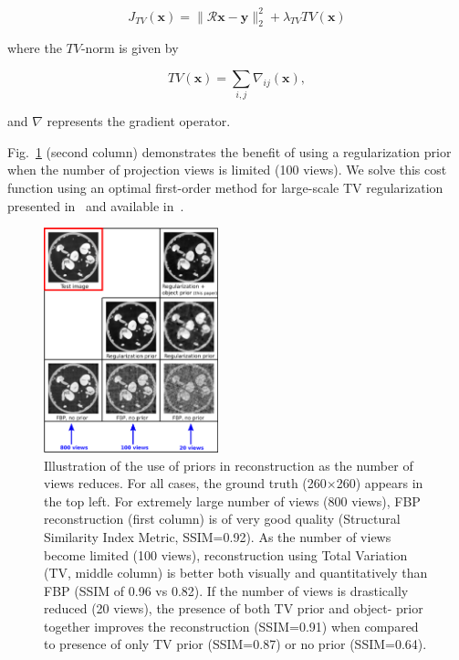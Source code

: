 \documentclass[journal]{IEEEtran}
\begin{document}
 \begin{equation}
   J_{TV}(\boldsymbol{x}) = \lVert\boldsymbol{\mathcal{R}x}- \boldsymbol{y}\rVert_2^2 + \lambda_{TV}TV(\boldsymbol{x})
   \label{Eq:simple_TV}
 \end{equation}

 where the $TV$-norm is given by

  \begin{equation}
   TV(\boldsymbol{x}) = \sum_{i,j}\nabla_{ij}(\boldsymbol{x}),
   \label{Eq:definition_TV}
\end{equation}

  and $\nabla$ represents the gradient operator.
  
 Fig.~\ref{fig:story} (second column) demonstrates the benefit of
 using a regularization prior when the number of projection views is
 limited (100 views).  We solve this cost function using an optimal
 first-order method for large-scale TV regularization presented
 in~\cite{TVReg} and available in~\cite{TVReg-lib}.


 \begin{figure}[t]
\centering
	\includegraphics[width=0.45\textwidth]{../images/story/post_TCI/story.png}
        \caption{Illustration of the use of  priors in 
          reconstruction as the number of views reduces. For all cases,
          the ground truth (260$\times$260) appears in the top left.
          For extremely large number of views (800 views), FBP
          reconstruction (first column) is of very good quality
          (Structural Similarity Index Metric, SSIM=0.92). As the
          number of views become limited (100 views), 
          reconstruction using Total Variation (TV, middle column) is
          better both visually and quantitatively than FBP (SSIM of
          0.96 vs 0.82). If the number of views is drastically reduced
          (20 views), the presence of both TV prior and object-
          prior together improves the reconstruction (SSIM=0.91) when compared
          to presence of only TV prior (SSIM=0.87) or no prior
          (SSIM=0.64).}
 \label{fig:story}
 \end{figure} 
\end{document}
